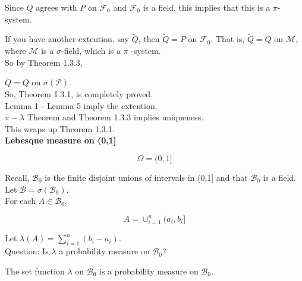 \documentclass[11pt,fleqn]{book} %
\begin{document}
Since $Q$ agrees with $P$ on $\mathscr{F}_0$ and $\mathscr{F}_0$ is a field, this implies that this is a $\pi$-system.

If you have another extention, say $\tilde{Q}$, then $\tilde{Q} = P$ on $\mathscr{F}_0$. That is, $\tilde{Q} = Q$ on $\mathscr{M}$, where $\mathscr{M}$ is a $\sigma$-field, which is a $\pi$
-system.\\

So by Theorem 1.3.3, 

$\tilde{Q} = Q$ on $\sigma(\mathscr{P})$. \\

So, Theorem 1.3.1, is completely proved. \\


Lemma 1 - Lemma 5 imply the extention.\\
$\pi-\lambda$ Theorem and Theorem 1.3.3 implies uniqueness. \\
This wraps up Theorem 1.3.1.\\



\textbf{Lebesque measure on (0,1]}

$$\Omega = (0,1]$$

Recall, $\mathscr{B}_0$ is the finite disjoint unions of intervals in (0,1] and that $\mathscr{B}_0$ is a field. \\

Let $\mathscr{B} = \sigma(\mathscr{B}_0)$.\\

For each $A \in \mathscr{B}_0$, 

$$A = \cup^n_{i=1} (a_i, b_i] $$

Let $\lambda(A) = \displaystyle \sum^n_{i=1} (b_i - a_i)$.\\

Question: Is $\lambda$ a probability measure on $\mathscr{B}_0$?

\begin{theorem}

The set function $\lambda$ on $\mathscr{B}_0$ is a probability measure on $\mathscr{B}_0$.
	
\end{theorem}
\end{document}
